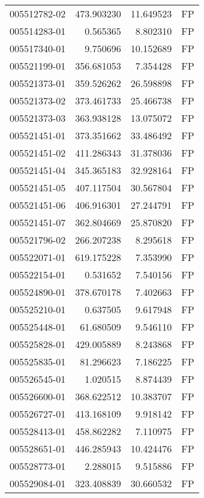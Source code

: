 \begin{tabular}{lrrl}
005512782-02 &  473.903230 &      11.649523 &   FP \\
005514283-01 &    0.565365 &       8.802310 &   FP \\
005517340-01 &    9.750696 &      10.152689 &   FP \\
005521199-01 &  356.681053 &       7.354428 &   FP \\
005521373-01 &  359.526262 &      26.598898 &   FP \\
005521373-02 &  373.461733 &      25.466738 &   FP \\
005521373-03 &  363.938128 &      13.075072 &   FP \\
005521451-01 &  373.351662 &      33.486492 &   FP \\
005521451-02 &  411.286343 &      31.378036 &   FP \\
005521451-04 &  345.365183 &      32.928164 &   FP \\
005521451-05 &  407.117504 &      30.567804 &   FP \\
005521451-06 &  406.916301 &      27.244791 &   FP \\
005521451-07 &  362.804669 &      25.870820 &   FP \\
005521796-02 &  266.207238 &       8.295618 &   FP \\
005522071-01 &  619.175228 &       7.353990 &   FP \\
005522154-01 &    0.531652 &       7.540156 &   FP \\
005524890-01 &  378.670178 &       7.402663 &   FP \\
005525210-01 &    0.637505 &       9.617948 &   FP \\
005525448-01 &   61.680509 &       9.546110 &   FP \\
005525828-01 &  429.005889 &       8.243868 &   FP \\
005525835-01 &   81.296623 &       7.186225 &   FP \\
005526545-01 &    1.020515 &       8.874439 &   FP \\
005526600-01 &  368.622512 &      10.383707 &   FP \\
005526727-01 &  413.168109 &       9.918142 &   FP \\
005528413-01 &  458.862282 &       7.110975 &   FP \\
005528651-01 &  446.285943 &      10.424476 &   FP \\
005528773-01 &    2.288015 &       9.515886 &   FP \\
005529084-01 &  323.408839 &      30.660532 &   FP \\

\end{tabular}
